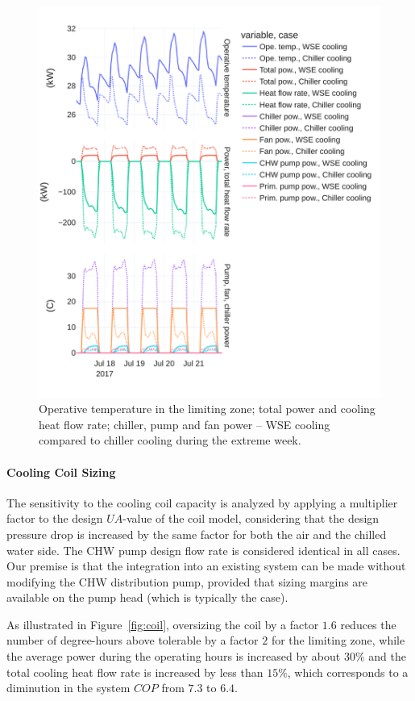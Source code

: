 \begin{figure}[!htbp]
    \centering
    \includegraphics[width=.7\linewidth]{../python_scripts/figures/TOpe.pdf}
    \caption{Operative temperature in the limiting zone; total power and cooling heat flow rate; chiller, pump and fan power -- WSE cooling compared to chiller cooling during the extreme week.}
    \label{fig:tope}
\end{figure}


\paragraph{Cooling Coil Sizing} \label{par:cooling_coil}

The sensitivity to the cooling coil capacity is analyzed by applying a multiplier factor to the design $UA$-value of the coil model,  considering that the design pressure drop is increased by the same factor for both the air and the chilled water side. The CHW pump design flow rate is considered identical in all cases.
Our premise is that the integration into an existing system can be made without modifying the CHW distribution pump, provided that sizing margins are available on the pump head (which is typically the case).

As illustrated in Figure~\ref{fig:coil}, oversizing the coil by a factor $1.6$ reduces the number of degree-hours above tolerable by a factor $2$ for the limiting zone, while the average power during the operating hours is increased by about $30\%$ and the total cooling heat flow rate is increased by less than $15\%$, which corresponds to a diminution in the system $COP$ from $7.3$ to $6.4$.

